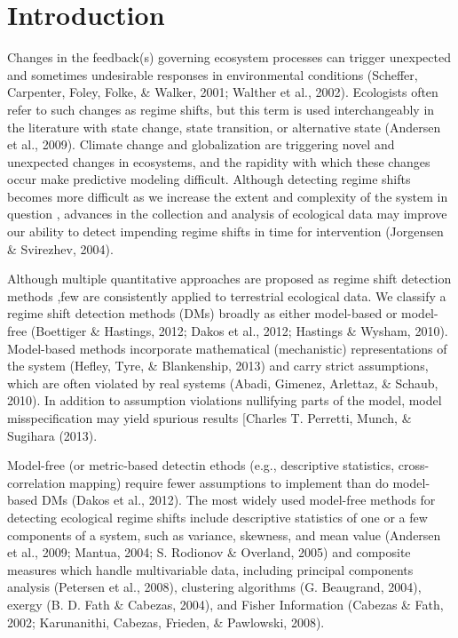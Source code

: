 \documentclass[12pt,twoside,openany]{reedthesis}
\begin{document}
\section{Introduction}\label{introduction-1}

Changes in the feedback(s) governing ecosystem processes can trigger
unexpected and sometimes undesirable responses in environmental
conditions (Scheffer, Carpenter, Foley, Folke, \& Walker, 2001; Walther
et al., 2002). Ecologists often refer to such changes as regime shifts,
but this term is used interchangeably in the literature with state
change, state transition, or alternative state (Andersen et al., 2009).
Climate change and globalization are triggering novel and unexpected
changes in ecosystems, and the rapidity with which these changes occur
make predictive modeling difficult. Although detecting regime shifts
becomes more difficult as we increase the extent and complexity of the
system in question , advances in the collection and analysis of
ecological data may improve our ability to detect impending regime
shifts in time for intervention (Jorgensen \& Svirezhev, 2004).

Although multiple quantitative approaches are proposed as regime shift
detection methods ,few are consistently applied to terrestrial
ecological data. We classify a regime shift detection methods (DMs)
broadly as either model-based or model-free (Boettiger \& Hastings,
2012; Dakos et al., 2012; Hastings \& Wysham, 2010). Model-based methods
incorporate mathematical (mechanistic) representations of the system
(Hefley, Tyre, \& Blankenship, 2013) and carry strict assumptions, which
are often violated by real systems (Abadi, Gimenez, Arlettaz, \& Schaub,
2010). In addition to assumption violations nullifying parts of the
model, model misspecification may yield spurious results {[}Charles T.
Perretti, Munch, \& Sugihara (2013).

Model-free (or metric-based detectin ethods (e.g., descriptive
statistics, cross-correlation mapping) require fewer assumptions to
implement than do model-based DMs (Dakos et al., 2012). The most widely
used model-free methods for detecting ecological regime shifts include
descriptive statistics of one or a few components of a system, such as
variance, skewness, and mean value (Andersen et al., 2009; Mantua, 2004;
S. Rodionov \& Overland, 2005) and composite measures which handle
multivariable data, including principal components analysis (Petersen et
al., 2008), clustering algorithms (G. Beaugrand, 2004), exergy (B. D.
Fath \& Cabezas, 2004), and Fisher Information (Cabezas \& Fath, 2002;
Karunanithi, Cabezas, Frieden, \& Pawlowski, 2008).
\end{document}
